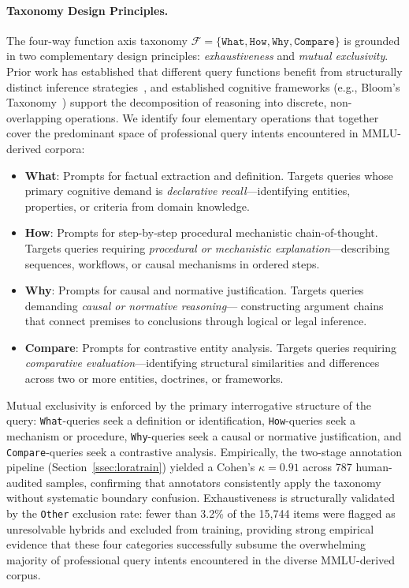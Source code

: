 \documentclass[a4paper,fleql]{cas-sc}
\begin{document}
\paragraph{Taxonomy Design Principles.}
The four-way function axis taxonomy $\mathcal{F} = \{\texttt{What},
\texttt{How}, \texttt{Why}, \texttt{Compare}\}$ is grounded in two
complementary design principles: \emph{exhaustiveness} and \emph{mutual
exclusivity}. Prior work has established that different query functions
benefit from structurally distinct inference strategies~\citep{wei2022chain},
and established cognitive frameworks (e.g., Bloom's Taxonomy~\citep{bloom1956taxonomy})
support the decomposition of reasoning into discrete, non-overlapping
operations. We identify four elementary operations that together cover the
predominant space of professional query intents encountered in MMLU-derived
corpora:

\begin{itemize}
    \item \textbf{What}: Prompts for factual extraction and definition.
    Targets queries whose primary cognitive demand is \emph{declarative
    recall}---identifying entities, properties, or criteria from domain
    knowledge.

    \item \textbf{How}: Prompts for step-by-step procedural
    mechanistic chain-of-thought. Targets queries requiring
    \emph{procedural or mechanistic explanation}---describing sequences,
    workflows, or causal mechanisms in ordered steps.

    \item \textbf{Why}: Prompts for causal and normative justification.
    Targets queries demanding \emph{causal or normative reasoning}---
    constructing argument chains that connect premises to conclusions
    through logical or legal inference.

    \item \textbf{Compare}: Prompts for contrastive entity analysis.
    Targets queries requiring \emph{comparative evaluation}---identifying
    structural similarities and differences across two or more entities,
    doctrines, or frameworks.
\end{itemize}

Mutual exclusivity is enforced by the primary interrogative structure of
the query: \texttt{What}-queries seek a definition or identification,
\texttt{How}-queries seek a mechanism or procedure, \texttt{Why}-queries
seek a causal or normative justification, and \texttt{Compare}-queries
seek a contrastive analysis. Empirically, the two-stage annotation
pipeline (Section~\ref{ssec:loratrain}) yielded a Cohen's $\kappa = 0.91$
across 787 human-audited samples, confirming that annotators consistently
apply the taxonomy without systematic boundary confusion. Exhaustiveness
is structurally validated by the \texttt{Other} exclusion rate: fewer than 
3.2\% of the 15,744 items were flagged as unresolvable hybrids and excluded 
from training, providing strong empirical evidence that these four categories 
successfully subsume the overwhelming majority of professional query intents 
encountered in the diverse MMLU-derived corpus.
\end{document}
